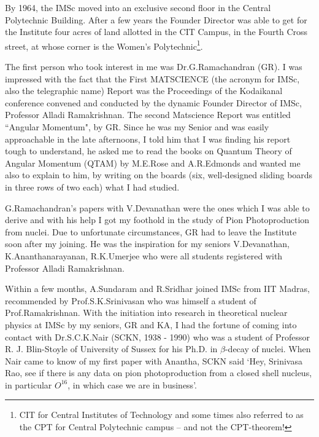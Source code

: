 By 1964, the IMSc moved into an exclusive second floor in the Central Polytechnic Building. After a few years the Founder Director was able to get for the Institute four acres of land allotted in the CIT Campus,  in the Fourth Cross street, at whose corner is the Women's Polytechnic\footnote{CIT for Central Institutes of Technology and some times also referred to as the CPT for Central Polytechnic campus -- and not the CPT-theorem!}.

The first person who took interest in me was Dr.G.Ramachandran (GR). I was impressed with the fact that the First MATSCIENCE (the acronym for IMSc, also the telegraphic name) Report was the Proceedings of the Kodaikanal conference convened and conducted by the dynamic Founder Director of IMSc, Professor Alladi Ramakrishnan. The second Matscience Report was entitled ``Angular Momentum", by GR. Since he was my Senior and was easily approachable in the late afternoons, I told him that I was finding his report tough to understand, he asked me to read the books on Quantum Theory of Angular Momentum (QTAM) by M.E.Rose and A.R.Edmonds and wanted me also to explain to him, by writing on the boards (six, well-designed sliding boards in three rows of two each) what I had studied.

G.Ramachandran's papers with V.Devanathan were the ones which I was able to derive and with his help I got my foothold in the study of Pion Photoproduction from nuclei. Due to unfortunate circumstances, GR had to leave the Institute soon after my joining. He was the inspiration for my seniors V.Devanathan, K.Ananthanarayanan, R.K.Umerjee who were all students registered with Professor Alladi Ramakrishnan.

Within a few months, A.Sundaram and R.Sridhar joined IMSc from IIT Madras, recommended by Prof.S.K.Srinivasan who was himself a student of Prof.Ramakrishnan. With the initiation into research in theoretical nuclear physics at IMSc by my seniors, GR and KA, I had the fortune of coming into contact with Dr.S.C.K.Nair (SCKN, 1938 - 1990) who was a student of Professor R. J. Blin-Stoyle of University of Sussex for his Ph.D. in $\beta$-decay of nuclei. When Nair came to know of my first paper with Anantha, SCKN said `Hey, Srinivasa Rao, see if there is any data on pion photoproduction from a closed shell nucleus, in particular $O^{16}$, in which case we are in business'.

